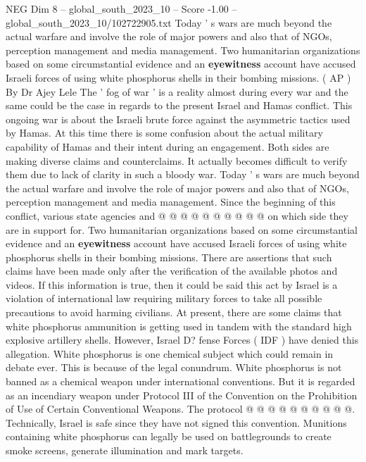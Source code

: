 \begin{textsample}{NEG Dim 8 – global\_south\_2023\_10 – Score -1.00 – global\_south\_2023\_10/102722905.txt}  \label{ex:f8_neg_098}
Today ' s wars are much beyond the actual warfare and involve the role of major powers and also that of NGOs, perception management and media management.
Two humanitarian organizations based on some circumstantial evidence and an \textbf{eyewitness} account have accused Israeli forces of using white phosphorus shells in their bombing missions. ( AP ) By Dr Ajey Lele The ' fog of war ' is a reality almost during every war and the same could be the case in regards to the present Israel and Hamas conflict.
This ongoing war is about the Israeli brute force against the asymmetric tactics used by Hamas.
At this time there is some confusion about the actual military capability of Hamas and their intent during an engagement.
Both sides are making diverse claims and counterclaims.
It actually becomes difficult to verify them due to lack of clarity in such a bloody war.
Today ' s wars are much beyond the actual warfare and involve the role of major powers and also that of NGOs, perception management and media management.
Since the beginning of this conflict, various state agencies and @ @ @ @ @ @ @ @ @ @ on which side they are in support for.
Two humanitarian organizations based on some circumstantial evidence and an \textbf{eyewitness} account have accused Israeli forces of using white phosphorus shells in their bombing missions.
There are assertions that such claims have been made only after the verification of the available photos and videos.
If this information is true, then it could be said this act by Israel is a violation of international law requiring military forces to take all possible precautions to avoid harming civilians.
At present, there are some claims that white phosphorus ammunition is getting used in tandem with the standard high explosive artillery shells.
However, Israel D? fense Forces ( IDF ) have denied this allegation.
White phosphorus is one chemical subject which could remain in debate ever.
This is because of the legal conundrum.
White phosphorus is not banned as a chemical weapon under international conventions.
But it is regarded as an incendiary weapon under Protocol III of the Convention on the Prohibition of Use of Certain Conventional Weapons.
The protocol @ @ @ @ @ @ @ @ @ @.
Technically, Israel is safe since they have not signed this convention.
Munitions containing white phosphorus can legally be used on battlegrounds to create smoke screens, generate illumination and mark targets.

\end{textsample}
